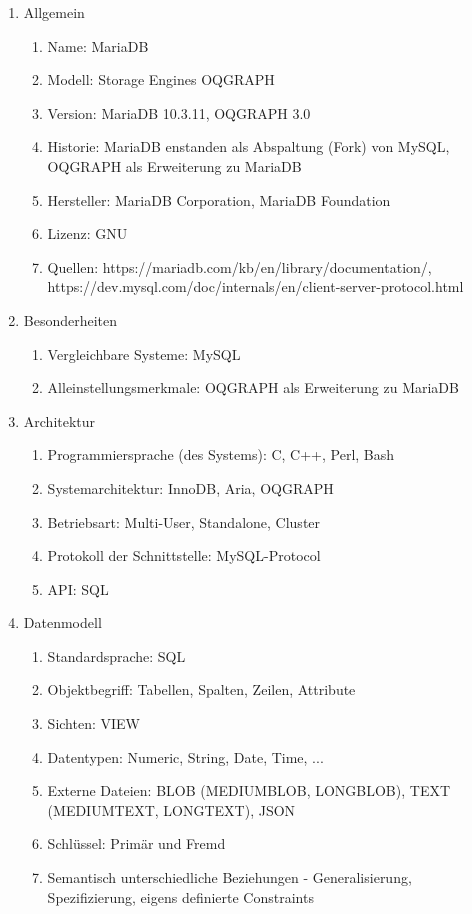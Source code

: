 \begin{enumerate}
	\item Allgemein
	\begin{enumerate}
		\item Name: MariaDB
		\item Modell: Storage Engines OQGRAPH
		\item Version: MariaDB 10.3.11, OQGRAPH 3.0
		\item Historie: MariaDB enstanden als Abspaltung (Fork) von MySQL, OQGRAPH als Erweiterung zu MariaDB
		\item Hersteller: MariaDB Corporation, MariaDB Foundation
		\item Lizenz: GNU
		\item Quellen: https://mariadb.com/kb/en/library/documentation/, 
		https://dev.mysql.com/doc/internals/en/client-server-protocol.html
	\end{enumerate}
\newpage
	\item Besonderheiten
	\begin{enumerate}
		\item Vergleichbare Systeme: MySQL
		\item Alleinstellungsmerkmale: OQGRAPH als Erweiterung zu MariaDB
	\end{enumerate}
	\item Architektur
	\begin{enumerate}
		\item Programmiersprache (des Systems): C, C++, Perl, Bash
		\item Systemarchitektur: InnoDB, Aria, OQGRAPH
		\item Betriebsart: Multi-User, Standalone, Cluster
		\item Protokoll der Schnittstelle: MySQL-Protocol
		\item API: SQL
	\end{enumerate}
	\item Datenmodell
	\begin{enumerate}
		\item Standardsprache: SQL
		\item Objektbegriff: Tabellen, Spalten, Zeilen, Attribute
		\item Sichten: VIEW
		\item Datentypen: Numeric, String, Date, Time, ...
		\item Externe Dateien: BLOB (MEDIUMBLOB, LONGBLOB), TEXT (MEDIUMTEXT, LONGTEXT), JSON
		\item Schlüssel: Primär und Fremd
		\item Semantisch unterschiedliche Beziehungen - Generalisierung, Spezifizierung, eigens definierte Constraints

\end{enumerate}
\end{enumerate}
